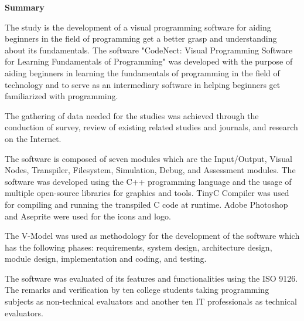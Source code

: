 \flushleft
\textbf{Summary}
\justifying

\parx
The study is the development of a visual programming software for aiding
beginners in the field of programming get a better grasp and understanding
about its fundamentals.  The software "CodeNect: Visual Programming Software
for Learning Fundamentals of Programming" was developed with the purpose of
aiding beginners in learning the fundamentals of programming in the field of
technology and to serve as an intermediary software in helping beginners get
familiarized with programming.

\parx
The gathering of data needed for the studies was achieved through the
conduction of survey, review of existing related studies and journals, and
research on the Internet.

\parx
The software is composed of seven modules which are the Input/Output, Visual
Nodes, Transpiler, Filesystem, Simulation, Debug, and Assessment modules. The
software was developed using the C++ programming language and the usage of
multiple open-source libraries for graphics and tools. TinyC Compiler was used
for compiling and running the transpiled C code at runtime. Adobe Photoshop
and Aseprite were used for the icons and logo.

\parx
The V-Model was used as methodology for the development of the software which
has the following phases: requirements, system design, architecture design, module
design, implementation and coding, and testing.

\parx
The software was evaluated of its features and functionalities using the ISO
9126. The remarks and verification by ten college students taking programming
subjects as non-technical evaluators and another ten IT professionals as technical
evaluators.

